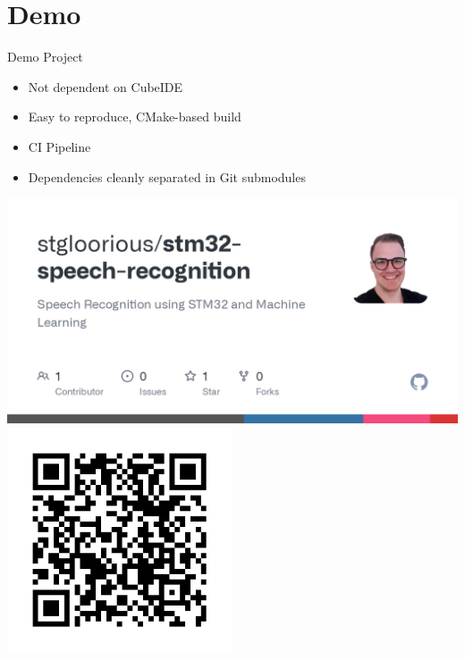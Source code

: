 \documentclass{beamer}
\begin{document}
\section{Demo}
\begin{frame}{Demo Project}
\begin{minipage}{0.49\textwidth}
	\begin{itemize}
		\item<2->Not dependent on CubeIDE
		\item<3->Easy to reproduce, CMake-based build
		\item<4->CI Pipeline
		\item<5->Dependencies cleanly separated in Git submodules
	\end{itemize}
	\end{minipage}
	\begin{minipage}{0.49\textwidth}
		\centering
	\includegraphics[width=\textwidth]{figures/github.png}
	\includegraphics[width=0.5\textwidth]{figures/qrcode.png}
	\end{minipage}

\end{frame}
\end{document}

